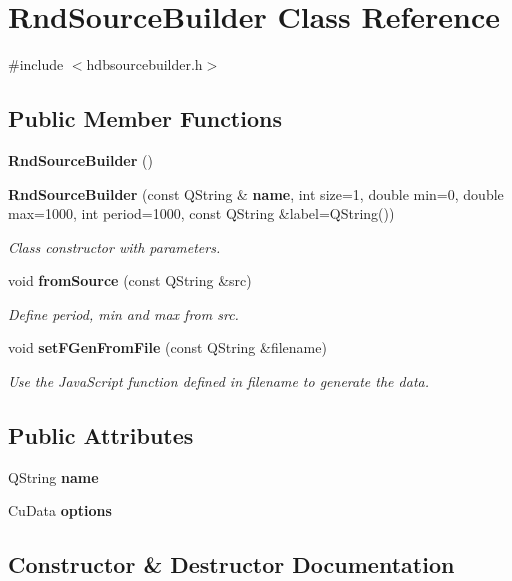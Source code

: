 \section{Rnd\+Source\+Builder Class Reference}
\label{classRndSourceBuilder}


{\ttfamily \#include $<$hdbsourcebuilder.\+h$>$}

\subsection*{Public Member Functions}
\begin{DoxyCompactItemize}
\item 
\textbf{ Rnd\+Source\+Builder} ()
\item 
\textbf{ Rnd\+Source\+Builder} (const Q\+String \&\textbf{ name}, int size=1, double min=0, double max=1000, int period=1000, const Q\+String \&label=Q\+String())
\begin{DoxyCompactList}\small\item\em Class constructor with parameters. \end{DoxyCompactList}\item 
void \textbf{ from\+Source} (const Q\+String \&src)
\begin{DoxyCompactList}\small\item\em Define period, min and max from src. \end{DoxyCompactList}\item 
void \textbf{ set\+F\+Gen\+From\+File} (const Q\+String \&filename)
\begin{DoxyCompactList}\small\item\em Use the Java\+Script function defined in filename to generate the data. \end{DoxyCompactList}\end{DoxyCompactItemize}
\subsection*{Public Attributes}
\begin{DoxyCompactItemize}
\item 
Q\+String \textbf{ name}
\item 
Cu\+Data \textbf{ options}
\end{DoxyCompactItemize}


\subsection{Constructor \& Destructor Documentation}
\mbox{\label{classRndSourceBuilder_ad5098ebea192db3e22c33b76ba7419ff}} 
